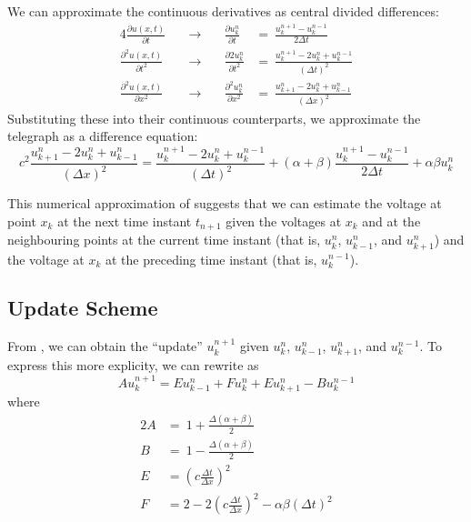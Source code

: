 \documentclass{article}
\begin{document}
We can approximate the continuous derivatives as central divided differences:
\begin{alignat*}{4}
   \frac{\partial u \left(x,t\right)}{\partial t}
   &\quad\longrightarrow\quad&
   \frac{\partial u_{k}^{n}}{\partial t}
   &=\ 
   \frac{u_{k}^{n+1} - u_{k}^{n-1}}{2 \Delta t} \\
   \frac{\partial^{2} u \left(x,t\right)}{\partial t^{2}}
   &\quad\longrightarrow\quad&
   \frac{\partial{2} u_{k}^{n}}{\partial t^{2}}
   &=\ 
   \frac{u_{k}^{n+1} - 2 u_{k}^{n} + u_{k}^{n-1}}{\left(\Delta t\right)^{2}} \\
   \frac{\partial^{2} u \left(x,t\right)}{\partial x^{2}}
   &\quad\longrightarrow\quad&
   \frac{\partial^{2} u_{k}^{n}}{\partial x^{2}}
   &=\ 
   \frac{u_{k+1}^{n} - 2 u_{k}^{n} + u_{k-1}^{n}}{\left(\Delta x\right)^{2}}
\end{alignat*}
Substituting these into their continuous counterparts, we approximate the telegraph as a difference equation:
\begin{equation}
   \label{eqn: Difference eqn full}
   c^{2} \frac{u_{k+1}^{n} - 2 u_{k}^{n} + u_{k-1}^{n}}{\left(\Delta x\right)^{2}}
   =
   \frac{u_{k}^{n+1} - 2 u_{k}^{n} + u_{k}^{n-1}}{\left(\Delta t\right)^{2}}
   +
   \left(\alpha + \beta\right) \frac{u_{k}^{n+1} - u_{k}^{n-1}}{2 \Delta t}
   +
   \alpha \beta u_{k}^{n}
\end{equation}

This numerical approximation of  suggests that we can estimate the voltage
at point $x_{k}$ at the next time instant $t_{n+1}$ given the voltages at $x_{k}$ and
at the neighbouring points at the current time instant
(that is, $u_{k}^{n}$, $u_{k-1}^{n}$, and $u_{k+1}^{n}$) and
the voltage at $x_{k}$ at the preceding time instant
(that is, $u_{k}^{n-1}$).

\subsection{Update Scheme}
\label{subsec: Update Scheme}

From , we can obtain the ``update'' $u_{k}^{n+1}$
given $u_{k}^{n}$, $u_{k-1}^{n}$, $u_{k+1}^{n}$, and $u_{k}^{n-1}$.
To express this more explicity, we can rewrite  as
\begin{equation}
   \label{eqn: Difference eqn short}
   A u_{k}^{n+1} = E u_{k-1}^{n} + F u_{k}^{n} + E u_{k+1}^{n} - B u_{k}^{n-1}
\end{equation}
where
\begin{alignat}{2}
   \label{eqn: A}
   A &=\ 1 + \frac{\Delta \left(\alpha + \beta\right)}{2} \\
   \label{eqn: B}
   B &=\ 1 - \frac{\Delta \left(\alpha + \beta\right)}{2} \\
   \label{eqn: E}
   E &= \left(c \frac{\Delta t}{\Delta x}\right)^{2} \\
   \label{eqn: F}
   F &= 2 - 2 \left(c \frac{\Delta t}{\Delta x}\right)^{2} - \alpha \beta \left(\Delta t\right)^{2}
\end{alignat}
\end{document}
